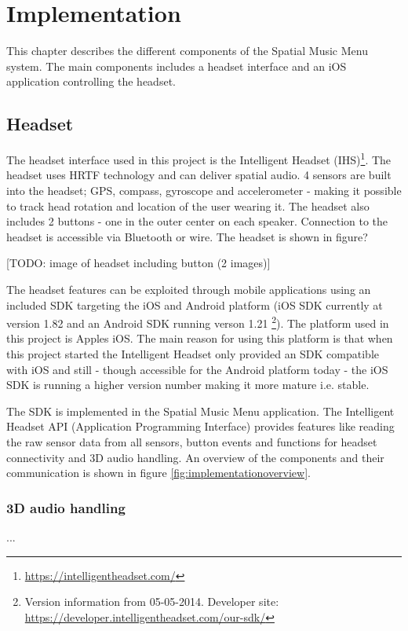\chapter{Implementation}
This chapter describes the different components of the Spatial Music Menu system. The main components includes a headset interface and an iOS application controlling the headset.


\section{Headset}
The headset interface used in this project is the Intelligent Headset (IHS)\footnote{\url{https://intelligentheadset.com/}}. The headset uses HRTF technology and can deliver spatial audio. 4 sensors are built into the headset; GPS, compass, gyroscope and accelerometer - making it possible to track head rotation and location of the user wearing it. The headset also includes 2 buttons - one in the outer center on each speaker. Connection to the headset is accessible via Bluetooth or wire. The headset is shown in figure?

[TODO: image of headset including button (2 images)]

The headset features can be exploited through mobile applications using an included SDK targeting the iOS and Android platform (iOS SDK currently at version 1.82 and an Android SDK running verson 1.21 \footnote{Version information from 05-05-2014. Developer site: \url{https://developer.intelligentheadset.com/our-sdk/}}). The platform used in this project is Apples iOS. The main reason for using this platform is that when this project started the Intelligent Headset only provided an SDK compatible with iOS and still - though accessible for the Android platform today - the iOS SDK is running a higher version number making it more mature i.e. stable.

The SDK is implemented in the Spatial Music Menu application. The Intelligent Headset API (Application Programming Interface) provides features like reading the raw sensor data from all sensors, button events and functions for headset connectivity and 3D audio handling. An overview of the components and their communication is shown in figure \ref{fig:implementationoverview}.

\subsection{3D audio handling}
...

